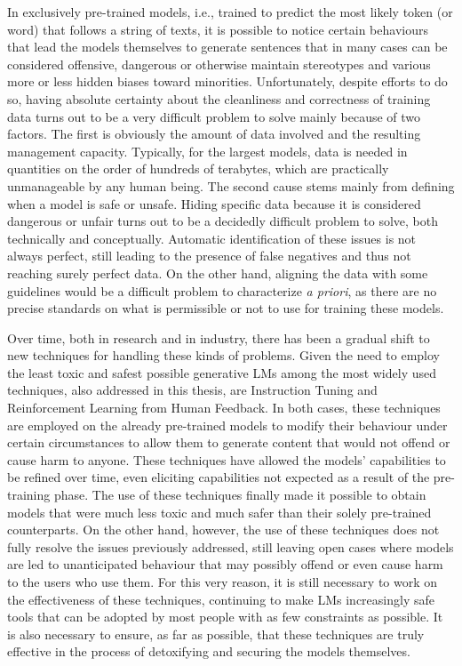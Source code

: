 In exclusively pre-trained models, i.e., trained to predict the most likely token (or word) that follows a string of texts, it is possible to notice certain behaviours that lead the models themselves to generate sentences that in many cases can be considered offensive, dangerous or otherwise maintain stereotypes and various more or less hidden biases toward minorities. Unfortunately, despite efforts to do so, having absolute certainty about the cleanliness and correctness of training data turns out to be a very difficult problem to solve mainly because of two factors. The first is obviously the amount of data involved and the resulting management capacity. Typically, for the largest models, data is needed in quantities on the order of hundreds of terabytes, which are practically unmanageable by any human being. The second cause stems mainly from defining when a model is safe or unsafe. Hiding specific data because it is considered dangerous or unfair turns out to be a decidedly difficult problem to solve, both technically and conceptually. Automatic identification of these issues is not always perfect, still leading to the presence of false negatives and thus not reaching surely perfect data. On the other hand, aligning the data with some guidelines would be a difficult problem to characterize \textit{a priori}, as there are no precise standards on what is permissible or not to use for training these models.

Over time, both in research and in industry, there has been a gradual shift to new techniques for handling these kinds of problems. Given the need to employ the least toxic and safest possible generative LMs among the most widely used techniques, also addressed in this thesis, are Instruction Tuning and Reinforcement Learning from Human Feedback. In both cases, these techniques are employed on the already pre-trained models to modify their behaviour under certain circumstances to allow them to generate content that would not offend or cause harm to anyone. These techniques have allowed the models' capabilities to be refined over time, even eliciting capabilities not expected as a result of the pre-training phase. The use of these techniques finally made it possible to obtain models that were much less toxic and much safer than their solely pre-trained counterparts. On the other hand, however, the use of these techniques does not fully resolve the issues previously addressed, still leaving open cases where models are led to unanticipated behaviour that may possibly offend or even cause harm to the users who use them. For this very reason, it is still necessary to work on the effectiveness of these techniques, continuing to make LMs increasingly safe tools that can be adopted by most people with as few constraints as possible. It is also necessary to ensure, as far as possible, that these techniques are truly effective in the process of detoxifying and securing the models themselves. 

